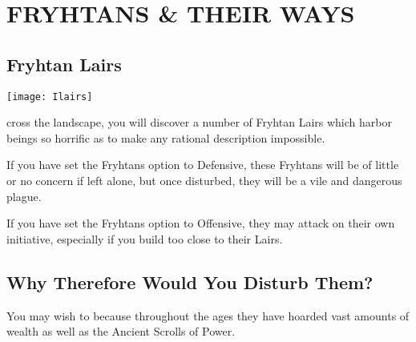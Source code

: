 
\chapter[Fryhtans \& Their Ways]{{\Huge F}RYHTANS {\Huge \&} {\Huge T}HEIR {\Huge W}AYS}

\section{Fryhtan Lairs}


\begin{center}
    \texttt{[image: Ilairs]} %
\end{center}

cross the landscape, you will discover a number of Fryhtan Lairs which harbor beings so horrific as to make any rational description impossible.

If you have set the Fryhtans option to Defensive, these Fryhtans will be of little or no concern if left alone, but once disturbed, they will be a vile and dangerous plague.

If you have set the Fryhtans option to Offensive, they may attack on their own initiative, especially if you build too close to their Lairs.

\section{Why Therefore Would You Disturb Them?}


You may wish to because throughout the ages they have hoarded vast amounts of wealth as well as the Ancient Scrolls of Power.

